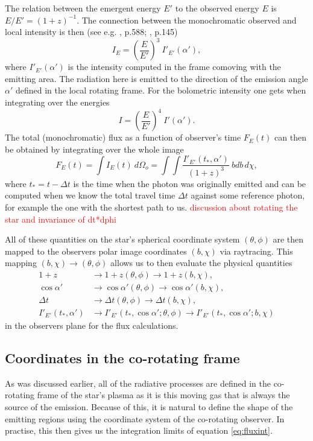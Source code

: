 \documentclass[iop, usenatbib]{emulateapj}
\newcommand{\be}{\begin{equation}}
\newcommand{\ee}{\end{equation}}
\newcommand{\red}[1]{\textcolor{red}{#1}}
\begin{document}
The relation between the emergent energy $E'$ to the observed energy $E$ is $E/E' = (1 + z)^{-1}$.
The connection between the monochromatic observed and local intensity is then (see e.g. \citealt{MTW73}, p.588; \citealt{RL79}, p.145)
\be
I_E = \left( \frac{E}{E'} \right)^3 ~I'_{E'}(\alpha'),
\ee
where $I'_{E'}(\alpha')$ is the intensity computed in the frame comoving with the emitting area.
The radiation here is emitted to the direction of the emission angle $\alpha'$ defined in the local rotating frame.
For the bolometric intensity one gets when integrating over the energies
\be
I = \left(\frac{E}{E'} \right)^4 ~I'(\alpha').
\ee
The total (monochromatic) flux as a function of observer's time $F_E(t)$ can then be obtained by integrating over the whole image
\be\label{eq:fluxint}
F_E(t) = \int I_{E}(t) ~d\Omega_o = \int\int \frac{I'_{E'}(t_*, \alpha')}{(1+z)^3}  ~bdb \, d\chi,
\ee
where $t_* = t - \Delta t$ is the time when the photon was originally emitted and can be computed when we know the total travel time $\Delta t$ against some reference photon, for example the one with the shortest path to us.
\red{discussion about rotating the star and invariance of dt*dphi}

All of these quantities on the star's spherical coordinate system $(\theta, \phi)$ are then mapped to the observers polar image coordinates $(b, \chi)$ via raytracing.
This mapping $(b, \chi) \rightarrow (\theta, \phi)$ allows us to then evaluate the physical quantities
\begin{align}
1+z                  &\rightarrow 1+z(\theta, \phi) \rightarrow 1+z(b, \chi), \\
\cos\alpha'          &\rightarrow \cos\alpha'(\theta, \phi) \rightarrow \cos\alpha'(b, \chi), \\
\Delta t             &\rightarrow \Delta t(\theta, \phi) \rightarrow \Delta t(b, \chi), \\
I'_{E'}(t_*, \alpha') &\rightarrow I'_{E'}(t_*, \cos\alpha'; \theta, \phi) \rightarrow I'_{E'}(t_*, \cos\alpha'; b, \chi)
\end{align}
in the observers plane for the flux calculations.

\subsection{Coordinates in the co-rotating frame}
As was discussed earlier, all of the radiative processes are defined in the co-rotating frame of the star's plasma as it is this moving gas that is always the source of the emission.
Because of this, it is natural to define the shape of the emitting regions using the coordinate system of the co-rotating observer.
In practise, this then gives us the integration limits of equation \eqref{eq:fluxint}.
\end{document}
